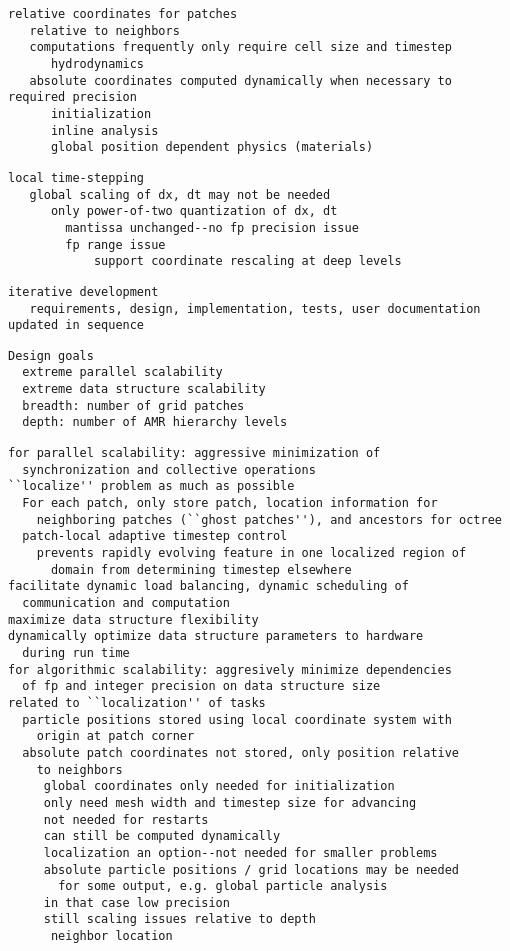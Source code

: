 \documentclass{article}
\begin{document}
\begin{verbatim}
relative coordinates for patches   
   relative to neighbors
   computations frequently only require cell size and timestep
      hydrodynamics
   absolute coordinates computed dynamically when necessary to required precision
      initialization
      inline analysis
      global position dependent physics (materials)
\end{verbatim}

\begin{verbatim}
local time-stepping
   global scaling of dx, dt may not be needed
      only power-of-two quantization of dx, dt
        mantissa unchanged--no fp precision issue
        fp range issue
            support coordinate rescaling at deep levels
\end{verbatim}

\begin{verbatim}
iterative development
   requirements, design, implementation, tests, user documentation updated in sequence
\end{verbatim}

\begin{verbatim}
Design goals
  extreme parallel scalability
  extreme data structure scalability
  breadth: number of grid patches
  depth: number of AMR hierarchy levels
\end{verbatim}

\begin{verbatim}
for parallel scalability: aggressive minimization of
  synchronization and collective operations
``localize'' problem as much as possible
  For each patch, only store patch, location information for
    neighboring patches (``ghost patches''), and ancestors for octree
  patch-local adaptive timestep control
    prevents rapidly evolving feature in one localized region of
      domain from determining timestep elsewhere
facilitate dynamic load balancing, dynamic scheduling of
  communication and computation
maximize data structure flexibility
dynamically optimize data structure parameters to hardware
  during run time
for algorithmic scalability: aggresively minimize dependencies
  of fp and integer precision on data structure size
related to ``localization'' of tasks
  particle positions stored using local coordinate system with
    origin at patch corner
  absolute patch coordinates not stored, only position relative
    to neighbors
     global coordinates only needed for initialization
     only need mesh width and timestep size for advancing
     not needed for restarts
     can still be computed dynamically
     localization an option--not needed for smaller problems
     absolute particle positions / grid locations may be needed
       for some output, e.g. global particle analysis
     in that case low precision
     still scaling issues relative to depth
      neighbor location
\end{verbatim}
\end{document}
